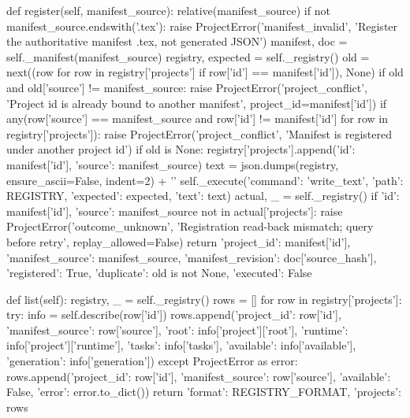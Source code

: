     def register(self, manifest_source):
        relative(manifest_source)
        if not manifest_source.endswith('.tex'):
            raise ProjectError('manifest_invalid', 'Register the authoritative manifest .tex, not generated JSON')
        manifest, doc = self._manifest(manifest_source)
        registry, expected = self._registry()
        old = next((row for row in registry['projects'] if row['id'] == manifest['id']), None)
        if old and old['source'] != manifest_source:
            raise ProjectError('project_conflict', 'Project id is already bound to another manifest', project_id=manifest['id'])
        if any(row['source'] == manifest_source and row['id'] != manifest['id'] for row in registry['projects']):
            raise ProjectError('project_conflict', 'Manifest is registered under another project id')
        if old is None:
            registry['projects'].append({'id': manifest['id'], 'source': manifest_source})
            text = json.dumps(registry, ensure_ascii=False, indent=2) + '\n'
            self._execute({'command': 'write_text', 'path': REGISTRY, 'expected': expected, 'text': text})
            actual, _ = self._registry()
            if {'id': manifest['id'], 'source': manifest_source} not in actual['projects']:
                raise ProjectError('outcome_unknown', 'Registration read-back mismatch; query before retry', replay_allowed=False)
        return {'project_id': manifest['id'], 'manifest_source': manifest_source,
                'manifest_revision': doc['source_hash'], 'registered': True, 'duplicate': old is not None,
                'executed': False}

    def list(self):
        registry, _ = self._registry()
        rows = []
        for row in registry['projects']:
            try:
                info = self.describe(row['id'])
                rows.append({'project_id': row['id'], 'manifest_source': row['source'],
                             'root': info['project']['root'], 'runtime': info['project']['runtime'],
                             'tasks': info['tasks'], 'available': info['available'],
                             'generation': info['generation']})
            except ProjectError as error:
                rows.append({'project_id': row['id'], 'manifest_source': row['source'],
                             'available': False, 'error': error.to_dict()})
        return {'format': REGISTRY_FORMAT, 'projects': rows}

